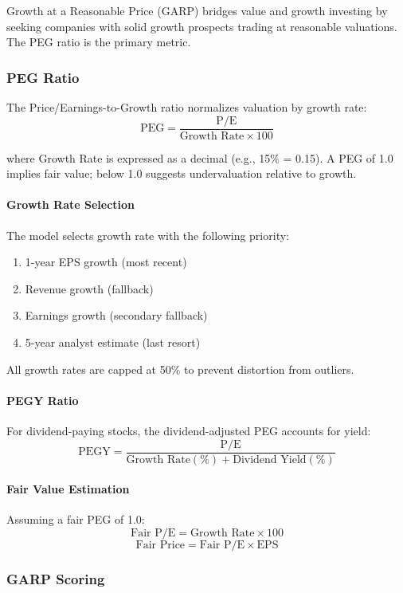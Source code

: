 Growth at a Reasonable Price (GARP) bridges value and growth investing by seeking companies with solid growth prospects trading at reasonable valuations. The PEG ratio is the primary metric.

\subsubsection{PEG Ratio}

The Price/Earnings-to-Growth ratio normalizes valuation by growth rate:
\[
\text{PEG} = \frac{\text{P/E}}{\text{Growth Rate} \times 100}
\]

where Growth Rate is expressed as a decimal (e.g., 15\% = 0.15). A PEG of 1.0 implies fair value; below 1.0 suggests undervaluation relative to growth.

\paragraph{Growth Rate Selection}

The model selects growth rate with the following priority:
\begin{enumerate}
  \item 1-year EPS growth (most recent)
  \item Revenue growth (fallback)
  \item Earnings growth (secondary fallback)
  \item 5-year analyst estimate (last resort)
\end{enumerate}

All growth rates are capped at 50\% to prevent distortion from outliers.

\paragraph{PEGY Ratio}

For dividend-paying stocks, the dividend-adjusted PEG accounts for yield:
\[
\text{PEGY} = \frac{\text{P/E}}{\text{Growth Rate}(\%) + \text{Dividend Yield}(\%)}
\]

\paragraph{Fair Value Estimation}

Assuming a fair PEG of 1.0:
\[
\text{Fair P/E} = \text{Growth Rate} \times 100
\]
\[
\text{Fair Price} = \text{Fair P/E} \times \text{EPS}
\]

\subsubsection{GARP Scoring}

